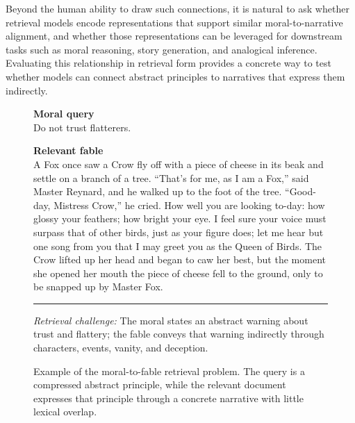 \documentclass[11pt]{article}
\begin{document}
Beyond the human ability to draw such connections, it is natural to ask whether retrieval models encode representations that support similar moral-to-narrative alignment, and whether those representations can be leveraged for downstream tasks such as moral reasoning, story generation, and analogical inference. 
Evaluating this relationship in retrieval form provides a concrete way to test whether models can connect abstract principles to narratives that express them indirectly.


\begin{figure}[t]
    \centering
    \begin{tcolorbox}[
        width=0.95\linewidth,
        colback=white,
        colframe=black,
        arc=4pt,
        boxrule=0.6pt,
        left=6pt,
        right=6pt,
        top=6pt,
        bottom=6pt
    ]
    \small
    \textbf{Moral query}\\
    Do not trust flatterers.

    \vspace{0.9em}

    \textbf{Relevant fable} \\
    A Fox once saw a Crow fly off with a piece of cheese in its beak and settle on a branch of a tree. ``That's for me, as I am a Fox,'' said Master Reynard, and he walked up to the foot of the tree. ``Good-day, Mistress Crow,'' he cried. How well you are looking to-day: how glossy your feathers; how bright your eye. I feel sure your voice must surpass that of other birds, just as your figure does; let me hear but one song from you that I may greet you as the Queen of Birds. The Crow lifted up her head and began to caw her best, but the moment she opened her mouth the piece of cheese fell to the ground, only to be snapped up by Master Fox.
    
    \vspace{1em}
    \hrule
    \vspace{1em}
    {\footnotesize
    \textit{Retrieval challenge:} The moral states an abstract warning about trust and flattery; the fable conveys that warning indirectly through characters, events, vanity, and deception.}

    \end{tcolorbox}
    
    \caption{Example of the moral-to-fable retrieval problem. The query is a compressed abstract principle, while the relevant document expresses that principle through a concrete narrative with little lexical overlap.}
    \label{fig:sample}
\end{figure}
\end{document}
